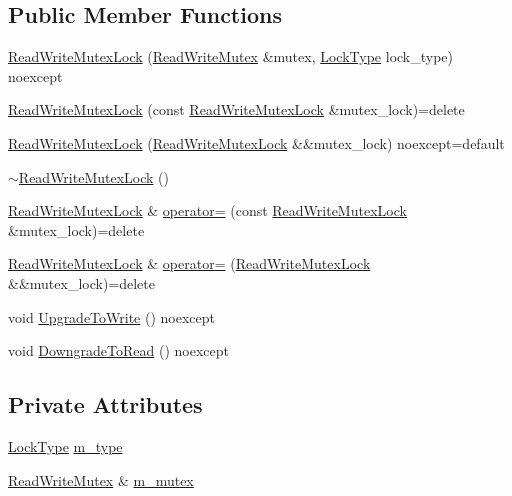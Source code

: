 \subsection*{Public Member Functions}
\begin{DoxyCompactItemize}
\item 
\hyperlink{structmage_1_1_read_write_mutex_lock_aadf5c0f0dd82c478d840bb7801060031}{Read\+Write\+Mutex\+Lock} (\hyperlink{structmage_1_1_read_write_mutex}{Read\+Write\+Mutex} \&mutex, \hyperlink{structmage_1_1_read_write_mutex_lock_a5fee0529edf58803ee1f5d4afa084a3b}{Lock\+Type} lock\+\_\+type) noexcept
\item 
\hyperlink{structmage_1_1_read_write_mutex_lock_a2c9cd6329bfd18c4752235ebee7edb4a}{Read\+Write\+Mutex\+Lock} (const \hyperlink{structmage_1_1_read_write_mutex_lock}{Read\+Write\+Mutex\+Lock} \&mutex\+\_\+lock)=delete
\item 
\hyperlink{structmage_1_1_read_write_mutex_lock_ac1c42cf89476d5e48e35d8b3fb05dc70}{Read\+Write\+Mutex\+Lock} (\hyperlink{structmage_1_1_read_write_mutex_lock}{Read\+Write\+Mutex\+Lock} \&\&mutex\+\_\+lock) noexcept=default
\item 
\hyperlink{structmage_1_1_read_write_mutex_lock_a64b600234d29ba7307fcd77a17486582}{$\sim$\+Read\+Write\+Mutex\+Lock} ()
\item 
\hyperlink{structmage_1_1_read_write_mutex_lock}{Read\+Write\+Mutex\+Lock} \& \hyperlink{structmage_1_1_read_write_mutex_lock_ade82a57f337e39a1515f67fbc1f6fc43}{operator=} (const \hyperlink{structmage_1_1_read_write_mutex_lock}{Read\+Write\+Mutex\+Lock} \&mutex\+\_\+lock)=delete
\item 
\hyperlink{structmage_1_1_read_write_mutex_lock}{Read\+Write\+Mutex\+Lock} \& \hyperlink{structmage_1_1_read_write_mutex_lock_a0c31334330a9259b0b68d71b9ee13704}{operator=} (\hyperlink{structmage_1_1_read_write_mutex_lock}{Read\+Write\+Mutex\+Lock} \&\&mutex\+\_\+lock)=delete
\item 
void \hyperlink{structmage_1_1_read_write_mutex_lock_a25629916d6a73e930763c34aaa13c647}{Upgrade\+To\+Write} () noexcept
\item 
void \hyperlink{structmage_1_1_read_write_mutex_lock_a1300da588c4a0950cca5a3b6a65d5f29}{Downgrade\+To\+Read} () noexcept
\end{DoxyCompactItemize}
\subsection*{Private Attributes}
\begin{DoxyCompactItemize}
\item 
\hyperlink{structmage_1_1_read_write_mutex_lock_a5fee0529edf58803ee1f5d4afa084a3b}{Lock\+Type} \hyperlink{structmage_1_1_read_write_mutex_lock_a754d235c4ba2f8f8da51342ad497a735}{m\+\_\+type}
\item 
\hyperlink{structmage_1_1_read_write_mutex}{Read\+Write\+Mutex} \& \hyperlink{structmage_1_1_read_write_mutex_lock_a6ee9034fa984e11ec07c20ec77ab1bfe}{m\+\_\+mutex}
\end{DoxyCompactItemize}


